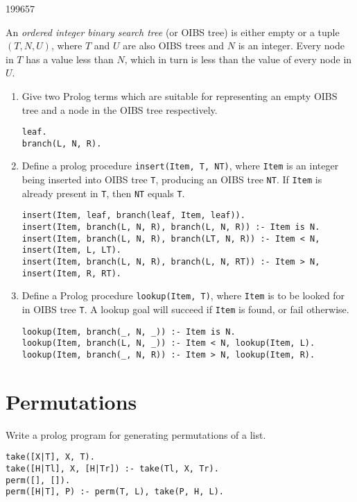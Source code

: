 \documentclass[10pt,\jkfside,a4paper]{article}
\begin{document}
\begin{examquestion}{1996}{5}{7}

An \textit{ordered integer binary search tree} (or OIBS tree) is either
empty or a tuple $(T, N, U)$, where $T$ and $U$ are also OIBS trees and $N$
is an integer. Every node in $T$ has a value less than $N$, which in turn
is less than the value of every node in $U$.

\begin{enumerate}

\item Give two Prolog terms which are suitable for representing an empty
OIBS tree and a node in the OIBS tree respectively.

\begin{lstlisting}[style=pstyle]
leaf.
branch(L, N, R).
\end{lstlisting}

\item Define a prolog procedure \texttt{insert(Item, T, NT)}, where
\texttt{Item} is an integer being inserted into OIBS tree \texttt{T},
producing an OIBS tree \texttt{NT}. If \texttt{Item} is already present in
\texttt{T}, then \texttt{NT} equals \texttt{T}.

\begin{lstlisting}[style=pstyle]
insert(Item, leaf, branch(leaf, Item, leaf)).
insert(Item, branch(L, N, R), branch(L, N, R)) :- Item is N.
insert(Item, branch(L, N, R), branch(LT, N, R)) :- Item < N, insert(Item, L, LT).
insert(Item, branch(L, N, R), branch(L, N, RT)) :- Item > N, insert(Item, R, RT).
\end{lstlisting}

\item Define a Prolog procedure \texttt{lookup(Item, T)}, where
\texttt{Item} is to be looked for in OIBS tree \texttt{T}. A lookup goal
will succeed if \texttt{Item} is found, or fail otherwise.

\begin{lstlisting}[style=pstyle]
lookup(Item, branch(_, N, _)) :- Item is N.
lookup(Item, branch(L, N, _)) :- Item < N, lookup(Item, L).
lookup(Item, branch(_, N, R)) :- Item > N, lookup(Item, R).
\end{lstlisting}

\end{enumerate}

\end{examquestion}

\section{Permutations}

Write a prolog program for generating permutations of a list.

\begin{lstlisting}[style=pstyle]
take([X|T], X, T).
take([H|Tl], X, [H|Tr]) :- take(Tl, X, Tr).
perm([], []).
perm([H|T], P) :- perm(T, L), take(P, H, L).
\end{lstlisting}
\end{document}
